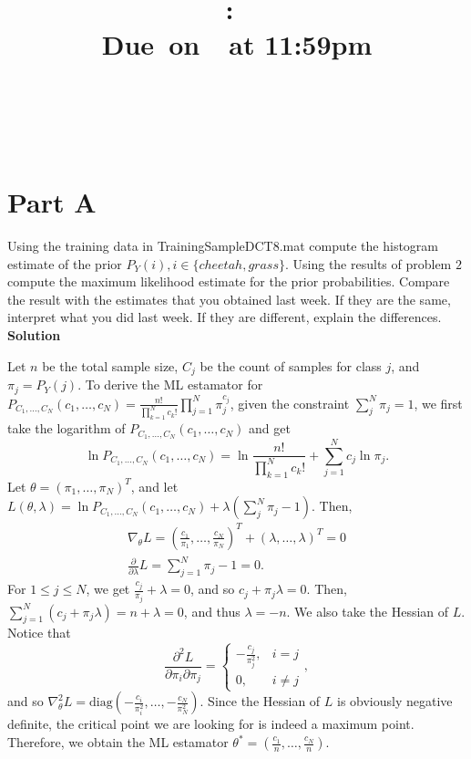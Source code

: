 \documentclass{article}
\title{
    \vspace{2in}
    \textmd{\textbf{\hmwkClass:\ \hmwkTitle}}\\
    \normalsize\vspace{0.1in}\small{Due\ on\ \hmwkDueDate\ at 11:59pm}\\
    \vspace{0.1in}\large{\textit{\hmwkClassInstructor}} \\
    \vspace{3in}
}
\author{
  \hmwkAuthorName \\
  \vspace{0.1in}\small\hmwkPID
}
\date{}
\begin{document}
\maketitle

\pagebreak

\section*{Part A}

Using the training data in {\selectfont TrainingSampleDCT\textunderscore8.mat} compute the histogram estimate of the prior
$P_Y(i), i \in \{cheetah, grass\}$. Using the results of problem $2$ compute the maximum likelihood estimate
for the prior probabilities. Compare the result with the estimates that you obtained last week. If they
are the same, interpret what you did last week. If they are different, explain the differences.
\\

\textbf{\large Solution}

Let $n$ be the total sample size, $C_j$ be the count of samples for class $j$, and $\pi_j = P_Y(j)$.
To derive the ML estamator for $P_{C_1,\dots,C_N}(c_1,\dots,c_N) = \frac{n!}{\prod_{k = 1}^N c_k!}\prod^N_{j = 1}\pi^{c_j}_j$, given the constraint $\sum^N_j \pi_j = 1$,
we first take the logarithm of $P_{C_1,\dots,C_N}(c_1,\dots,c_N)$ and get
\[
  \ln P_{C_1,\dots,C_N}(c_1,\dots,c_N) = \ln \frac{n!}{\prod_{k = 1}^N c_k!} + \sum^N_{j = 1} c_j \ln \pi_j.
\]
Let $\theta = (\pi_1, \dots, \pi_N)^T$, and let $L(\theta, \lambda) = \ln P_{C_1,\dots,C_N}(c_1,\dots,c_N) + \lambda\left(\sum^N_j \pi_j - 1\right)$.
Then,
\begin{gather*}
  \nabla_{\theta}L = \left(\frac{c_1}{\pi_1},\dots, \frac{c_N}{\pi_N}\right)^T + (\lambda, \dots, \lambda)^T = 0 \\
  \frac{\partial}{\partial \lambda}L = \sum_{j = 1}^N \pi_j - 1 = 0.
\end{gather*}
For $1 \leq j \leq N$, we get $\frac{c_j}{\pi_j} + \lambda = 0$, and so $c_j + \pi_j\lambda = 0$. 
Then, $\sum^N_{j = 1} (c_j + \pi_j\lambda) = n + \lambda = 0$, and thus $ \lambda = -n$. 
We also take the Hessian of $L$. Notice that 
\[
    \frac{\partial^2 L}{\partial \pi_i \partial \pi_j} = \begin{cases}
        -\frac{c_j}{\pi_j^2}, & i = j \\
        0, & i \neq j
    \end{cases},
\]
and so $\nabla^2_{\theta} L = \text{diag}\left(-\frac{c_i}{\pi_i^2}, \dots, -\frac{c_N}{\pi_N^2}\right)$.
Since the Hessian of $L$ is obviously negative definite, the critical point we are looking for is indeed a maximum point.
Therefore, we obtain the ML estamator $\theta^* = \left(\frac{c_1}{n},\dots, \frac{c_N}{n}\right)$.
\end{document}
